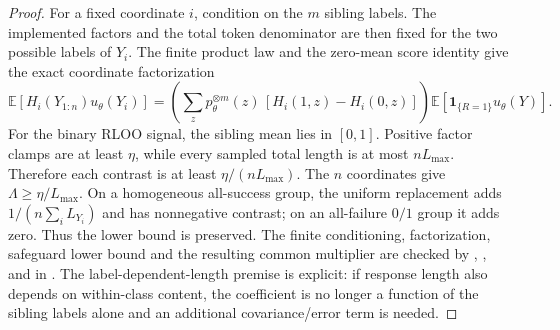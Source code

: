 \begin{proof}
For a fixed coordinate $i$, condition on the $m$ sibling labels. The
implemented factors and the total token denominator are then fixed for the
two possible labels of $Y_i$. The finite product law and the zero-mean score
identity give the exact coordinate factorization
\[
 \mathbb E[H_i(Y_{1:n})u_\theta(Y_i)]
 =\left(\sum_z p_\theta^{\otimes m}(z)\,[H_i(1,z)-H_i(0,z)]\right)
   \mathbb E[\mathbf 1_{\{R=1\}}u_\theta(Y)].
\]
For the binary RLOO signal, the sibling mean lies in $[0,1]$. Positive
factor clamps are at least $\eta$, while every sampled total length is at
most $nL_{\max}$. Therefore each contrast is at least
$\eta/(nL_{\max})$. The $n$ coordinates give
$\Lambda\ge\eta/L_{\max}$. On a homogeneous all-success group, the
uniform replacement adds $1/(n\sum_iL_{Y_i})$ and has nonnegative contrast;
on an all-failure $0/1$ group it adds zero. Thus the lower bound is preserved.
The finite conditioning, factorization, safeguard lower bound and the
resulting common multiplier are checked by
, , and
 in .
The label-dependent-length premise is explicit: if response length also
depends on within-class content, the coefficient is no longer a function of
the sibling labels alone and an additional covariance/error term is needed.
\end{proof}

